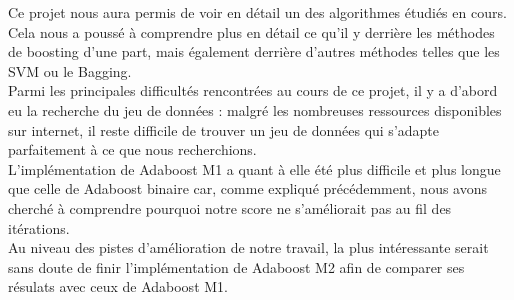 \documentclass{article}
\begin{document}
Ce projet nous aura permis de voir en détail un des algorithmes étudiés en cours. Cela nous a poussé à comprendre plus en détail ce qu'il y derrière les méthodes de boosting d'une part, mais également derrière d'autres méthodes telles que les SVM ou le Bagging.\\

Parmi les principales difficultés rencontrées au cours de ce projet, il y a d'abord eu la recherche du jeu de données : malgré les nombreuses ressources disponibles sur internet, il reste difficile de trouver un jeu de données qui s'adapte parfaitement à ce que nous recherchions.\\

L'implémentation de Adaboost M1 a quant à elle été plus difficile et plus longue que celle de Adaboost binaire car, comme expliqué précédemment, nous avons cherché à comprendre pourquoi notre score ne s'améliorait pas au fil des itérations.\\

Au niveau des pistes d'amélioration de notre travail, la plus intéressante serait sans doute de finir l'implémentation de Adaboost M2 afin de comparer ses résulats avec ceux de Adaboost M1.



\end{document}
